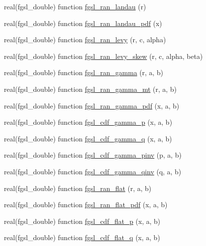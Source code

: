 \begin{DoxyCompactItemize}
\item 
real(fgsl\-\_\-double) function \hyperlink{rng_8finc_a4fddb2cbe7750f04fb6fafeaca3d4475}{fgsl\-\_\-ran\-\_\-landau} (r)
\item 
real(fgsl\-\_\-double) function \hyperlink{rng_8finc_a3838bd54f8cd69e289ce48f50d804e13}{fgsl\-\_\-ran\-\_\-landau\-\_\-pdf} (x)
\item 
real(fgsl\-\_\-double) function \hyperlink{rng_8finc_a8453b1f8c3e81ec2eaabfc6612ce44aa}{fgsl\-\_\-ran\-\_\-levy} (r, c, alpha)
\item 
real(fgsl\-\_\-double) function \hyperlink{rng_8finc_a43ea311600d0fdcccc054b043d6ec519}{fgsl\-\_\-ran\-\_\-levy\-\_\-skew} (r, c, alpha, beta)
\item 
real(fgsl\-\_\-double) function \hyperlink{rng_8finc_a75b8328e601702d544764bf044864486}{fgsl\-\_\-ran\-\_\-gamma} (r, a, b)
\item 
real(fgsl\-\_\-double) function \hyperlink{rng_8finc_ac1a501f4dfe734274569151dfaf25477}{fgsl\-\_\-ran\-\_\-gamma\-\_\-mt} (r, a, b)
\item 
real(fgsl\-\_\-double) function \hyperlink{rng_8finc_ab4786a7f6aa42d75d825b5a32d193ce4}{fgsl\-\_\-ran\-\_\-gamma\-\_\-pdf} (x, a, b)
\item 
real(fgsl\-\_\-double) function \hyperlink{rng_8finc_a0bac4d4b3ce06b0f58112852fa7b32ce}{fgsl\-\_\-cdf\-\_\-gamma\-\_\-p} (x, a, b)
\item 
real(fgsl\-\_\-double) function \hyperlink{rng_8finc_af7323ad0e46d157a40a3a1e8c5adbcc3}{fgsl\-\_\-cdf\-\_\-gamma\-\_\-q} (x, a, b)
\item 
real(fgsl\-\_\-double) function \hyperlink{rng_8finc_ad98d9f27ebc4c29347f7178437ad2042}{fgsl\-\_\-cdf\-\_\-gamma\-\_\-pinv} (p, a, b)
\item 
real(fgsl\-\_\-double) function \hyperlink{rng_8finc_a98d9bdf34354f709686562da8a8852e7}{fgsl\-\_\-cdf\-\_\-gamma\-\_\-qinv} (q, a, b)
\item 
real(fgsl\-\_\-double) function \hyperlink{rng_8finc_acd9641232d480f05b1abe1590c0f27b2}{fgsl\-\_\-ran\-\_\-flat} (r, a, b)
\item 
real(fgsl\-\_\-double) function \hyperlink{rng_8finc_a4436b84330131f34805ea941042e464a}{fgsl\-\_\-ran\-\_\-flat\-\_\-pdf} (x, a, b)
\item 
real(fgsl\-\_\-double) function \hyperlink{rng_8finc_a53c32d3a1c1e49be4369425594820754}{fgsl\-\_\-cdf\-\_\-flat\-\_\-p} (x, a, b)
\item 
real(fgsl\-\_\-double) function \hyperlink{rng_8finc_a98244f046ad60405fb90bd7629d5f1be}{fgsl\-\_\-cdf\-\_\-flat\-\_\-q} (x, a, b)

\end{DoxyCompactItemize}
